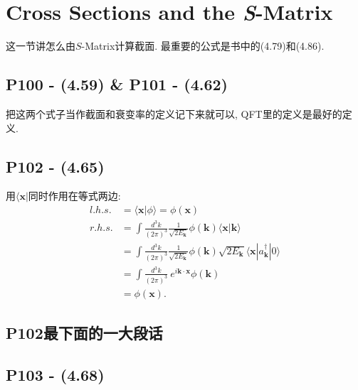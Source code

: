 \documentclass[10pt,b5paper,openany]{book}
\begin{document}
\section{Cross Sections and the \textit{S}-Matrix}

这一节讲怎么由$S$-Matrix计算截面. 最重要的公式是书中的(4.79)和(4.86). 

\subsection{P100 - (4.59) \& P101 - (4.62)}

把这两个式子当作截面和衰变率的定义记下来就可以, QFT里的定义是最好的定义. 

\subsection{P102 - (4.65)}

用$\langle \mathbf{x}|$同时作用在等式两边: 
\begin{equation}
  \begin{aligned}
    l.h.s. &= \langle \mathbf{x}|\phi \rangle = \phi(\mathbf{x}) \\ 
    r.h.s. &= \int\frac{d^3 k}{(2\pi)^3}\frac{1}{\sqrt{2E_{\mathbf{k}}}}\phi(\mathbf{k})\langle \mathbf{x}|\mathbf{k} \rangle \\
    &= \int\frac{d^3 k}{(2\pi)^3}\frac{1}{\sqrt{2E_{\mathbf{k}}}}\phi(\mathbf{k})\sqrt{2E_{\mathbf{k}}}\langle \mathbf{x}|a^{\dagger}_{\mathbf{k}}|0 \rangle \\
    &= \int\frac{d^3 k}{(2\pi)^3}\ e^{i\mathbf{k}\cdot\mathbf{x}}\phi(\mathbf{k}) \\
    &= \phi(\mathbf{x}).
  \end{aligned}
\end{equation}

\subsection{P102最下面的一大段话}

\begin{center}
\end{center}

\subsection{P103 - (4.68)}
\end{document}
